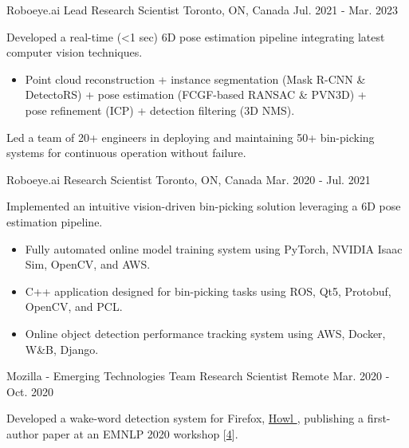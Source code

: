 \begin{cventries}
{\begin{cvitems}
\end{cvitems}
}
\cventry
{Roboeye.ai} %
{Lead Research Scientist} %
{Toronto, ON, Canada} %
{Jul. 2021 - Mar. 2023} %
{ %
\begin{cvitems}
\item {Developed a real-time (<1 sec) 6D pose estimation pipeline integrating latest computer vision techniques.}
\begin{itemize}[label=$\cdot$,leftmargin=0.7em]
\item{Point cloud reconstruction + instance segmentation (Mask R-CNN \& DetectoRS) + pose estimation (FCGF-based RANSAC \& PVN3D) + \\
pose refinement (ICP) + detection filtering (3D NMS).}
\end{itemize}
\item {Led a team of 20+ engineers in deploying and maintaining 50+ bin-picking systems for continuous operation without failure.}
\end{cvitems}
}
\cventry
{Roboeye.ai} %
{Research Scientist} %
{Toronto, ON, Canada} %
{Mar. 2020 - Jul. 2021} %
{ %
\begin{cvitems}
\item {Implemented an intuitive vision-driven bin-picking solution leveraging a 6D pose estimation pipeline.}
\begin{itemize}[label=$\cdot$,leftmargin=0.7em]
\item {Fully automated online model training system using PyTorch, NVIDIA Isaac Sim, OpenCV, and AWS.}
\item {C++ application designed for bin-picking tasks using ROS, Qt5, Protobuf, OpenCV, and PCL.}
\item {Online object detection performance tracking system using AWS, Docker, W\&B, Django.}
\end{itemize}
\end{cvitems}
}
\cventry
{Mozilla - Emerging Technologies Team} %
{Research Scientist} %
{Remote} %
{Mar. 2020 - Oct. 2020} %
{ %
\begin{cvitems}
\item {Developed a wake-word detection system for Firefox, \href{https://github.com/castorini/howl}{Howl {\small \faGithub}}, publishing a first-author paper at an EMNLP 2020 workshop [\hyperlink{howl:EMNLP}{4}].}

\end{cvitems}}
\end{cventries}
